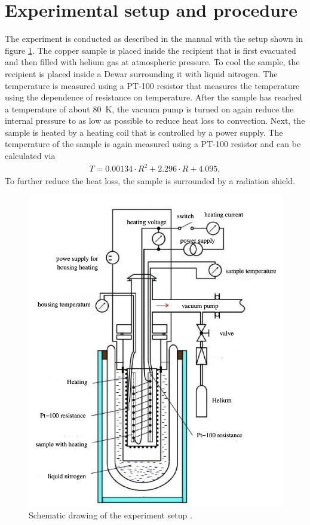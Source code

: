\section{Experimental setup and procedure} 
\label{sec:setup}

The experiment is conducted as described in the manual \cite{Anleitung47} with the setup shown in figure \ref{fig:setup}. \newline
The copper sample is placed inside the recipient that is first evacuated and then filled with helium gas at atmospheric pressure.
To cool the sample, the recipient is placed inside a Dewar surrounding it with liquid nitrogen.
The temperature is measured using a PT-100 resistor that measures the temperature using the dependence of resistance on temperature.
After the sample has reached a temperature of about \SI{80}{\kelvin}, the vacuum pump is turned on again reduce the internal pressure to as low as possible to reduce heat loss to convection.
Next, the sample is heated by a heating coil that is controlled by a power supply. 
The temperature of the sample is again measured using a PT-100 resistor and can be calculated via 
\begin{align}
    T = 0.00134 \cdot R^2 + 2.296 \cdot R + 4.095,
    \label{eq:temp}
\end{align}
To further reduce the heat loss, the sample is surrounded by a radiation shield.


\begin{figure}[H]
	\centering
    \includegraphics[width=0.6\linewidth]{data/experimental_setup.png}
	\caption{Schematic drawing of the experiment setup \cite{Anleitung47}.}
	\label{fig:setup}
\end{figure}